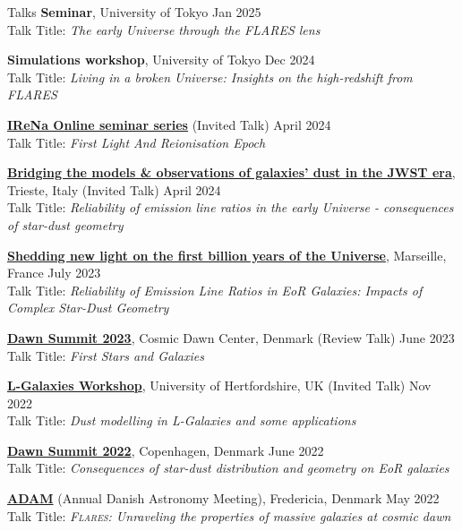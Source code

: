 \documentclass[a4paper,10pt]{resume} %
\begin{document}
\begin{rSection}{Talks}
	{\textbf{Seminar}, University of Tokyo} \hfill {Jan 2025}
	\\
	Talk Title: \textit{The early Universe through the FLARES lens}
	
	{\textbf{Simulations workshop}, University of Tokyo} \hfill {Dec 2024}
	\\
	Talk Title: \textit{Living in a broken Universe: Insights on the high-redshift from FLARES}
	
	{\textbf{\href{https://www.jinaweb.org/events/first-light-and-reionisation-epoch-featuring-aswin-vijayan-university-sussex}{IReNa Online seminar series}} (Invited Talk)} \hfill {April 2024}
	\\
	Talk Title: \textit{First Light And Reionisation Epoch}

	{\textbf{\href{https://darkdonevski.wixsite.com/dustfocusweek}{Bridging the models \& observations of galaxies' dust in the JWST era}}, Trieste, Italy (Invited Talk)} \hfill {April 2024}
	\\
	Talk Title: \textit{Reliability of emission line ratios in the early Universe - consequences of star-dust geometry}
	
	{\textbf{\href{https://geco2023-1gyr.sciencesconf.org/resource/page/id/2}{Shedding new light on the first billion years of the Universe}}, Marseille, France} \hfill {July 2023}
	\\
	Talk Title: \textit{Reliability of Emission Line Ratios in EoR Galaxies: Impacts of Complex Star-Dust Geometry}
	
	{\textbf{\href{https://cosmicdawn.dk/meetings-and-workshops/dawn-summit-2023/}{Dawn Summit 2023}}, Cosmic Dawn Center, Denmark (Review Talk)} \hfill {June 2023}
	\\
	Talk Title: \textit{First Stars and Galaxies}	
	
	{\textbf{\href{https://lgalaxiespublicrelease.github.io/workshop2022.html}{L-Galaxies Workshop}}, University of Hertfordshire, UK (Invited Talk)} \hfill {Nov 2022}
	\\
	Talk Title: \textit{Dust modelling in L-Galaxies and some applications}	
	
	{\textbf{\href{https://cosmicdawn.dk/meetings-and-workshops/dawn-summit-2022/}{Dawn Summit 2022}}, Copenhagen, Denmark} \hfill {June 2022}
	\\
	Talk Title: \textit{Consequences of star-dust distribution and geometry on EoR galaxies}
	
	{\textbf{\href{https://events.au.dk/adam2022}{ADAM}} (Annual Danish Astronomy Meeting), Fredericia, Denmark} \hfill {May 2022}
	\\
	{Talk Title: \textit{\textsc{Flares}: Unraveling the properties of massive galaxies at cosmic dawn}}
	

\end{rSection}
\end{document}
